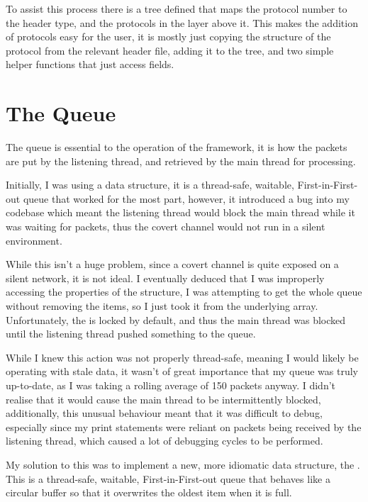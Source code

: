 To assist this process there is a tree defined that maps the protocol number to the header type, and the protocols in the layer above it. This makes the addition of protocols easy for the user, it is mostly just copying the structure of the protocol from the relevant header file, adding it to the tree, and two simple helper functions that just access fields.


\section{The Queue}
\label{sec:queue}

The queue is essential to the operation of the framework, it is how the packets are put by the listening thread, and retrieved by the main thread for processing.

Initially, I was using a  data structure, it is a thread-safe, waitable, First-in-First-out queue \cite{julia} that worked for the most part, however, it introduced a bug into my codebase which meant the listening thread would block the main thread while it was waiting for packets, thus the covert channel would not run in a silent environment.

While this isn't a huge problem, since a covert channel is quite exposed on a silent network, it is not ideal. I eventually deduced that I was improperly accessing the properties of the structure, I was attempting to get the whole queue without removing the items, so I just took it from the underlying array. Unfortunately, the  is locked by default, and thus the main thread was blocked until the listening thread pushed something to the queue.

While I knew this action was not properly thread-safe, meaning I would likely be operating with stale data, it wasn't of great importance that my queue was truly up-to-date, as I was taking a rolling average of 150 packets anyway. I didn't realise that it would cause the main thread to be intermittently blocked, additionally, this unusual behaviour meant that it was difficult to debug, especially since my print statements were reliant on packets being received by the listening thread, which caused a lot of debugging cycles to be performed.

My solution to this was to implement a new, more idiomatic data structure, the . This is a thread-safe, waitable, First-in-First-out queue that behaves like a circular buffer so that it overwrites the oldest item when it is full.

